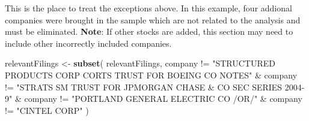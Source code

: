 \documentclass[english,man]{apa6}
\newenvironment{Shaded}{\begin{snugshade}}{\end{snugshade}}
\newcommand{\KeywordTok}[1]{\textcolor[rgb]{0.13,0.29,0.53}{\textbf{{#1}}}}
\newcommand{\DecValTok}[1]{\textcolor[rgb]{0.00,0.00,0.81}{{#1}}}
\newcommand{\StringTok}[1]{\textcolor[rgb]{0.31,0.60,0.02}{{#1}}}
\newcommand{\OtherTok}[1]{\textcolor[rgb]{0.56,0.35,0.01}{{#1}}}
\newcommand{\NormalTok}[1]{{#1}}
\begin{document}
\begin{Shaded}
\end{Shaded}

This is the place to treat the exceptions above. In this example, four
addional companies were brought in the sample which are not related to
the analysis and must be eliminated. \textbf{Note}: If other stocks are
added, this section may need to include other incorrectly included
companies.

\begin{Shaded}
\begin{Highlighting}[]
\NormalTok{relevantFilings <-}
\StringTok{  }\KeywordTok{subset}\NormalTok{(}
  \NormalTok{relevantFilings,}
  \NormalTok{company !=}\StringTok{ "STRUCTURED PRODUCTS CORP CORTS TRUST FOR BOEING CO NOTES"} \NormalTok{&}
\StringTok{  }\NormalTok{company !=}\StringTok{ "STRATS SM TRUST FOR JPMORGAN CHASE & CO SEC SERIES 2004-9"} \NormalTok{&}
\StringTok{  }\NormalTok{company !=}\StringTok{ "PORTLAND GENERAL ELECTRIC CO /OR/"} \NormalTok{&}
\StringTok{  }\NormalTok{company !=}\StringTok{ "CINTEL CORP"}
  \NormalTok{)}
\end{Highlighting}
\end{Shaded}
\end{document}
